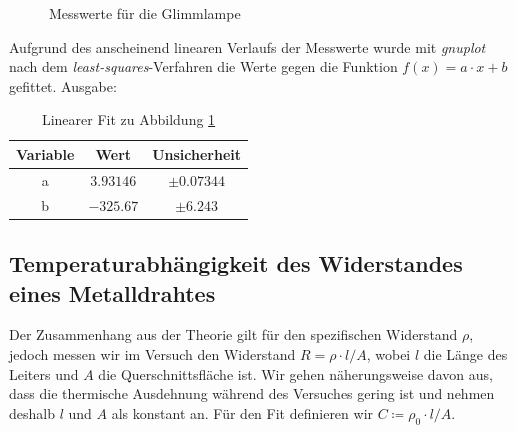 \begin{figure}[H]
\centering
{}
\caption{Messwerte für die Glimmlampe}
\label{fig:glimm}
\end{figure}
Aufgrund des anscheinend linearen Verlaufs der Messwerte wurde mit \emph{gnuplot} nach dem \emph{least-squares}-Verfahren die Werte gegen die Funktion $f(x)=a\cdot x +b$ gefittet. Ausgabe:
\begin{table}[H]
  \centering
  \begin{tabular}{c | c | c }
    Variable   & Wert & Unsicherheit\\ \hline
    a & $\num{3.93146}$ & $\pm\num{0.07344}$ \\
    b & $\num{-325.67}$ & $\pm\num{6.243}$ \\
  \end{tabular}
  \caption{Linearer Fit zu Abbildung \ref{fig:glimm}}
  \label{tab:fitglimm}
\end{table}
\subsection{Temperaturabhängigkeit des Widerstandes eines Metalldrahtes}
Der Zusammenhang aus der Theorie gilt für den spezifischen Widerstand $\rho$, jedoch messen wir im Versuch den Widerstand $R=\rho\cdot l/A$, wobei $l$ die Länge des Leiters und $A$ die Querschnittsfläche ist. Wir gehen näherungsweise davon aus, dass die thermische Ausdehnung während des Versuches gering ist und nehmen deshalb $l$ und $A$ als konstant an. Für den Fit definieren wir $C\coloneqq \rho_0\cdot l/A$.

